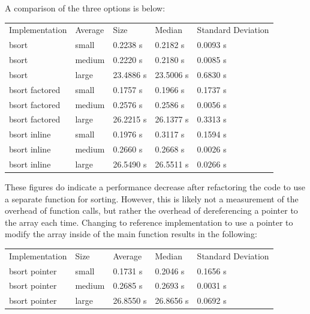 \documentclass{article}
\begin{document}
A comparison of the three options is below:

\begin{center}
\begin{tabular}{lllll}
 Implementation  &  Average  & Size &  Median     &  Standard Deviation  \\
 bsort           &  small    &  0.2238 s   &  0.2182 s            &  0.0093 s  \\
 bsort           &  medium   &  0.2220 s   &  0.2180 s            &  0.0085 s  \\
 bsort           &  large    &  23.4886 s  &  23.5006 s           &  0.6830 s  \\
 bsort factored  &  small    &  0.1757 s   &  0.1966 s            &  0.1737 s  \\
 bsort factored  &  medium   &  0.2576 s   &  0.2586 s            &
 0.0056 s  \\
bsort factored  &  large    &  26.2215 s  &  26.1377 s           &  0.3313 s  \\
 bsort inline    &  small    &  0.1976 s   &  0.3117 s            &  0.1594 s  \\
 bsort inline    &  medium   &  0.2660 s   &  0.2668 s            &
 0.0026 s  \\
bsort inline    &  large    &  26.5490 s  &  26.5511 s           &  0.0266 s  \\
\end{tabular}
\end{center}

These figures do indicate a performance decrease after refactoring
the code to use a separate function for sorting. However, this is likely not a
measurement of the overhead of function calls, but rather the overhead
of dereferencing a pointer to the array each time. Changing to
reference implementation to use a pointer to modify the array inside
of the main function results in the following:

\begin{center}
\begin{tabular}{lllll}
 Implementation  &  Size    &  Average    &  Median     &  Standard Deviation  \\
 bsort pointer   &  small   &  0.1731 s   &  0.2046 s   &  0.1656 s            \\
 bsort pointer   &  medium  &  0.2685 s   &  0.2693 s   &  0.0031 s            \\
 bsort pointer   &  large   &  26.8550 s  &  26.8656 s  &  0.0692 s            \\
\end{tabular}
\end{center}
\end{document}

